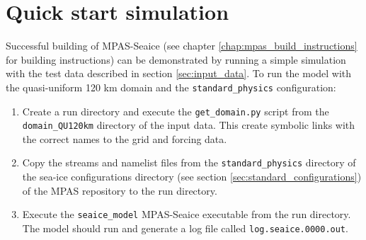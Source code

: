 \section{Quick start simulation}
\label{sec:simple_simulations}

Successful building of MPAS-Seaice (see chapter \ref{chap:mpas_build_instructions} for building instructions) can be demonstrated by running a simple simulation with the test data described in section \ref{sec:input_data}. To run the model with the quasi-uniform 120 km domain and the \lstinline+standard_physics+ configuration:

\begin{enumerate}

\item Create a run directory and execute the \lstinline+get_domain.py+ script from the \lstinline+domain_QU120km+ directory of the input data. This create symbolic links with the correct names to the grid and forcing data.

\item Copy the streams and namelist files from the \lstinline+standard_physics+ directory of the sea-ice configurations directory (see section \ref{sec:standard_configurations}) of the MPAS repository to the run directory.

\item Execute the \lstinline+seaice_model+ MPAS-Seaice executable from the run directory. The model should run and generate a log file called \lstinline+log.seaice.0000.out+.

\end{enumerate}

